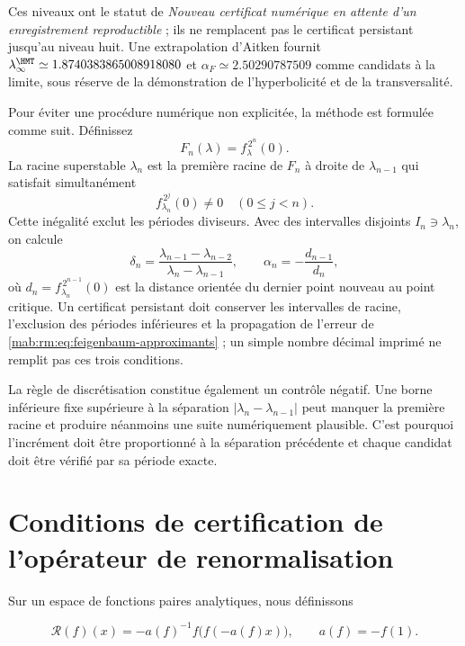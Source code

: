 Ces niveaux ont le statut de \emph{Nouveau certificat numérique
en attente d’un enregistrement reproductible} ; ils ne remplacent pas le certificat persistant
jusqu’au niveau huit. Une extrapolation d’Aitken fournit
\(\lambda_\infty^{\HMT}\simeq1.8740383865008918080\) et
\(\alpha_F\simeq2.50290787509\) comme candidats à la limite, sous réserve de
la démonstration de l’hyperbolicité et de la transversalité.

Pour éviter une procédure numérique non explicitée, la méthode est formulée comme
suit. Définissez
\begin{equation}
F_n(\lambda)=f_\lambda^{\,2^n}(0).
\label{mab:rm:eq:superstable-equation}
\end{equation}
La racine superstable \(\lambda_n\) est la première racine de \(F_n\) à
droite de \(\lambda_{n-1}\) qui satisfait simultanément
\[
f_{\lambda_n}^{\,2^j}(0)\ne0
\quad(0\le j<n).
\]
Cette inégalité exclut les périodes diviseurs. Avec des intervalles disjoints
\(I_n\ni\lambda_n\), on calcule
\begin{equation}
\delta_n=
\frac{\lambda_{n-1}-\lambda_{n-2}}
     {\lambda_n-\lambda_{n-1}},
\qquad
\alpha_n=-\frac{d_{n-1}}{d_n},
\label{mab:rm:eq:feigenbaum-approximants}
\end{equation}
où \(d_n=f_{\lambda_n}^{\,2^{n-1}}(0)\) est la distance orientée du
dernier point nouveau au point critique. Un certificat persistant doit conserver
les intervalles de racine, l’exclusion des périodes inférieures et la propagation
de l’erreur de \cref{mab:rm:eq:feigenbaum-approximants} ; un simple nombre décimal imprimé ne
remplit pas ces trois conditions.

La règle de discrétisation constitue également un contrôle négatif. Une
borne inférieure fixe supérieure à la séparation
\(|\lambda_n-\lambda_{n-1}|\) peut manquer la première racine et produire
néanmoins une suite numériquement plausible. C’est pourquoi l’incrément
doit être proportionné à la séparation précédente et chaque candidat doit être vérifié
par sa période exacte.

\section{Conditions de certification de l’opérateur de renormalisation}

Sur un espace de fonctions paires analytiques, nous définissons

\begin{equation}
\mathcal R(f)(x)=-a(f)^{-1}f\bigl(f(-a(f)x)\bigr),
\qquad a(f)=-f(1).
\label{mab:rm:eq:renormalization}
\end{equation}

